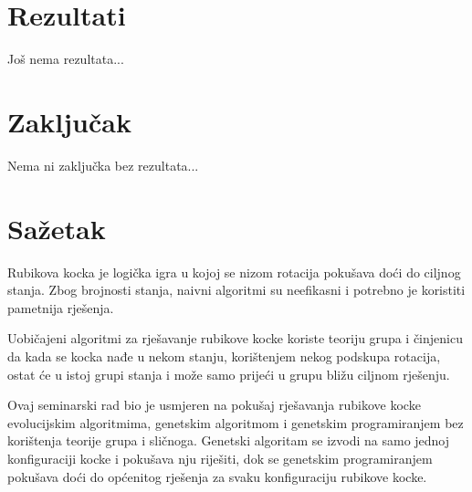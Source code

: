 \documentclass[times, utf8, seminar, numeric]{fer}
\begin{document}
\chapter{Rezultati}
Još nema rezultata...

\chapter{Zaključak}
Nema ni zaključka bez rezultata...




\chapter{Sažetak}
Rubikova kocka je logička igra u kojoj se nizom rotacija pokušava doći do ciljnog stanja. Zbog brojnosti stanja, naivni algoritmi su neefikasni i potrebno je koristiti pametnija rješenja.

Uobičajeni algoritmi za rješavanje rubikove kocke koriste teoriju grupa i činjenicu da kada se kocka nađe u nekom stanju, korištenjem nekog podskupa rotacija, ostat će u istoj grupi stanja i može samo prijeći u grupu bližu ciljnom rješenju.

Ovaj seminarski rad bio je usmjeren na pokušaj rješavanja rubikove kocke evolucijskim algoritmima, genetskim algoritmom i genetskim programiranjem bez korištenja teorije grupa i sličnoga. Genetski algoritam se izvodi na samo jednoj konfiguraciji kocke i pokušava nju riješiti, dok se genetskim programiranjem pokušava doći do općenitog rješenja za svaku konfiguraciju rubikove kocke.

 
\end{document}
